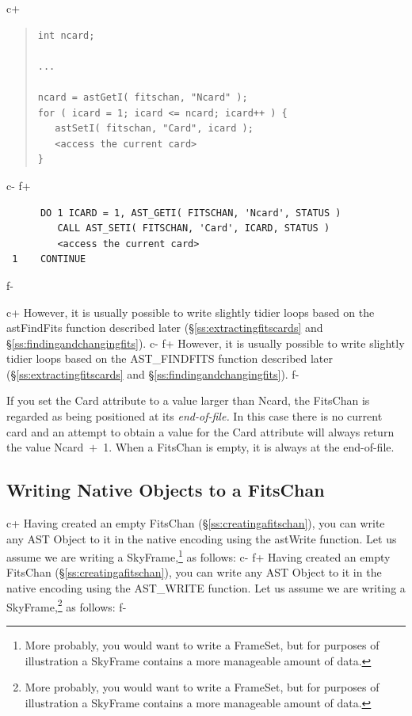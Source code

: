 \documentclass[twoside,11pt]{article}
\newcommand{\secref}[1]{\S\ref{#1}}
\newcommand{\secref}[1]{\ref{#1}}
\begin{document}
c+
\begin{quote}
\small
\begin{verbatim}
int ncard;

...

ncard = astGetI( fitschan, "Ncard" );
for ( icard = 1; icard <= ncard; icard++ ) {
   astSetI( fitschan, "Card", icard );
   <access the current card>
}
\end{verbatim}
\normalsize
\end{quote}
c-
f+
\small
\begin{verbatim}
      DO 1 ICARD = 1, AST_GETI( FITSCHAN, 'Ncard', STATUS )
         CALL AST_SETI( FITSCHAN, 'Card', ICARD, STATUS )
         <access the current card>
 1    CONTINUE
\end{verbatim}
\normalsize
f-

c+
However, it is usually possible to write slightly tidier loops based
on the astFindFits function described later
(\secref{ss:extractingfitscards} and
\secref{ss:findingandchangingfits}).
c-
f+
However, it is usually possible to write slightly tidier loops based
on the AST\_FINDFITS function described later
(\secref{ss:extractingfitscards} and
\secref{ss:findingandchangingfits}).
f-

If you set the Card attribute to a value larger than Ncard, the
FitsChan is regarded as being positioned at its {\em{end-of-file.}} In
this case there is no current card and an attempt to obtain a value
for the Card attribute will always return the value Ncard~$+$~1. When
a FitsChan is empty, it is always at the end-of-file.
 
\subsection{\label{ss:writingnativefits}Writing Native Objects to a FitsChan}

c+
Having created an empty FitsChan (\secref{ss:creatingafitschan}), you
can write any AST Object to it in the native encoding using the
astWrite function. Let us assume we are writing a
SkyFrame,\footnote{More probably, you would want to write a FrameSet,
but for purposes of illustration a SkyFrame contains a more manageable
amount of data.} as follows:
c-
f+
Having created an empty FitsChan (\secref{ss:creatingafitschan}), you
can write any AST Object to it in the native encoding using the
AST\_WRITE function. Let us assume we are writing a
SkyFrame,\footnote{More probably, you would want to write a FrameSet,
but for purposes of illustration a SkyFrame contains a more manageable
amount of data.} as follows:
f-
\end{document}
